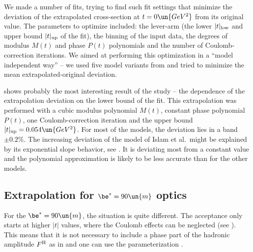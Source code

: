 
We made a number of fits, trying to find such fit settings that minimize the deviation of the extrapolated cross-section at $t=0\un{GeV^2}$ from its original value. The parameters to optimize included: the lever-arm (the lower $|t|_{\rm low}$ and upper bound $|t|_{\rm up}$ of the fit), the binning of the input data, the degrees of modulus $M(t)$ and phase $P(t)$ polynomials and the number of Coulomb-correction iterations. We aimed at performing this optimization in a ``model independent way'' -- we used five model variants from  and tried to minimize the mean extrapolated-original deviation.


 shows probably the most interesting result of the study -- the dependence of the extrapolation deviation on the lower bound of the fit. This extrapolation was performed with a cubic modulus polynomial $M(t)$, constant phase polynomial $P(t)$, one Coulomb-correction iteration and the upper bound $|t|_{\rm up} = 0.054\un{GeV^2}$. For most of the models, the deviation lies in a band $\pm 0.2\percent$. The increasing deviation of the model of Islam et al.~might be explained by its exponential slope behavior, see . It is deviating most from a constant value and the polynomial approximation is likely to be less accurate than for the other models.





\def\OutlineLabel{Extrapolation for beta* = 90 m optics}
\def\TOCLabel{Extrapolation for $\be^* = 90$ m optics}
\subsection{Extrapolation for $\be^* = 90\un{m}$ optics}

For the $\be^* = 90\un{m}$, the situation is quite different. The acceptance only starts at higher $|t|$ values, where the Coulomb effects can be neglected (see ). This means that it is not necessary to include a phase part of the hadronic amplitude $F^{\rm H}$ as in  and one can use the parameterization . 

